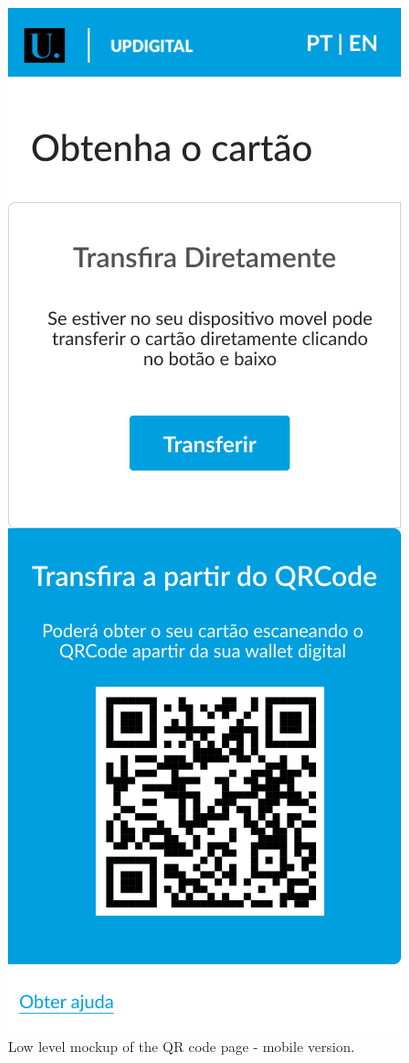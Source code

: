 \documentclass[10pt]{article}
\begin{document}
\begin{figure}[H]
\begin{minipage}{0.18\textwidth}
    \includegraphics[width=\linewidth]{report-images/qrcode-page-mobile.png}
    \caption{Low level mockup of the QR code page - mobile version.}
    \label{fig:fig-12}
  \end{minipage}
\end{figure}
\end{document}
